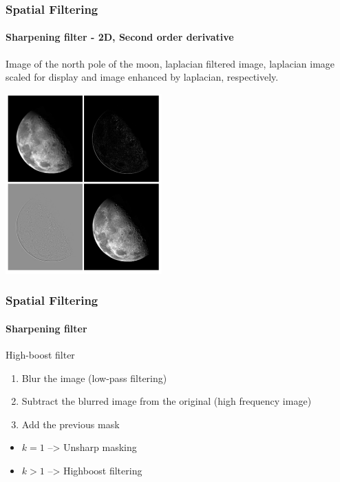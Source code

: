 \documentclass[table]{beamer}
\begin{document}
\begin{frame}
\frametitle{Spatial Filtering}
\framesubtitle{Sharpening filter - 2D, Second order derivative}
Image of the north pole of the moon, laplacian filtered image, laplacian image scaled for display and image enhanced by laplacian, respectively.
\begin{center}
\includegraphics[width = 0.45\textwidth, height = 0.6\textheight]{images/Spatial8-laplacian-ex.png} 
\end{center}
\end{frame}
\begin{frame}
\frametitle{Spatial Filtering}
\framesubtitle{Sharpening filter}

\begin{block}{High-boost filter}
\begin{enumerate}
\item Blur the image (low-pass filtering)
\item Subtract the blurred image from the original (high frequency image)
\item Add the previous mask 
\end{enumerate}
\begin{itemize}
\item $k =1$ --> Unsharp masking 
\item $k >1$ --> Highboost filtering
\end{itemize}
\end{block}
\end{frame}
\end{document}
